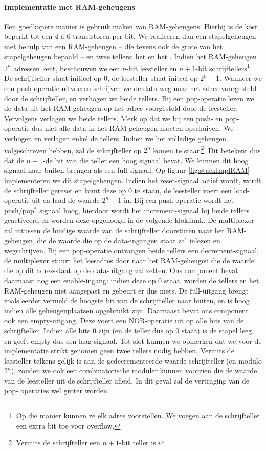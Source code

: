 \paragraph{Implementatie met RAM-geheugens}
Een goedkopere manier is gebruik maken van RAM-geheugens. Hierbij is de kost beperkt tot een 4 \`a 6 transistoren per bit. We realiseren dan een stapelgeheugen met behulp van een RAM-geheugen -- die tevens ook de grote van het stapelgeheugen bepaald -- en twee tellers: het  en het . Indien het RAM-geheugen $2^n$ adressen kent, beschouwen we een $n$-bit leesteller en $n+1$-bit schrijftellers\footnote{Op die manier kunnen ze elk adres voorstellen. We voegen aan de schrijfteller een extra bit toe voor overflow.}. De schrijfteller staat initieel op $0$, de leesteller staat initeel op $2^n-1$. Wanneer we een push operatie uitvoeren schrijven we de data weg naar het adres voorgesteld door de schrijfteller, en verhogen we beide tellers. Bij een pop-operatie lezen we de data uit het RAM-geheugen op het adres voorgesteld door de leesteller. Vervolgens verlagen we beide tellers. Merk op dat we bij een push- en pop-operatie dus niet alle data in het RAM-geheugen moeten opschuiven.
We verhogen en verlagen enkel de tellers. Indien we het volledige geheugen volgeschreven hebben, zal de schrijfteller op $2^n$ komen te staan\footnote{Vermits de schrijfteller een $n+1$-bit teller is.}. Dit betekent dus dat de $n+1$-de bit van die teller een hoog signaal bevat. We kunnen dit hoog signaal naar buiten brengen als een full-signaal. Op figuur \ref{fig:stackImplRAM} implementeren we dit stapelgeheugen. Indien het reset-signaal actief wordt, wordt de schrijfteller gereset en komt deze op 0 te staan, de leesteller voert een load-operatie uit en laad de waarde $2^n-1$ in. Bij een push-operatie wordt het push/pop$^*$ signaal hoog, hierdoor wordt het increment-signaal bij beide tellers geactiveerd en worden deze opgehoogd in de volgende klokflank. De multiplexer zal intussen de huidige waarde van de schrijfteller doorsturen naar het RAM-geheugen, die de waarde die op de data-ingangen staat zal inlezen en wegschrijven. Bij een pop-operatie ontvangen beide tellers een decrement-signaal, de multiplexer
stuurt het leesadres door naar het RAM-geheugen die de waarde die op dit adres-staat op de data-uitgang zal zetten. Ons component bevat daarnaast nog een enable-ingang: indien deze op 0 staat, worden de tellers en het RAM-geheugen niet aangepast en gebeurt er dus niets. De full-uitgang brengt zoals eerder vermeld de hoogste bit van de schrijfteller naar buiten, en is hoog indien alle geheugenplaatsen opgebruikt zijn. Daarnaast bevat ons component ook een empty-uitgang. Deze voert een NOR-operatie uit op alle bits van de schrijfteller. Indien alle bits 0 zijn (en de teller dus op 0 staat) is de stapel leeg, en geeft empty dus een laag signaal. Tot slot kunnen we opmerken dat we voor de implementatie strikt genomen geen twee tellers nodig hebben. Vermits de leesteller telkens gelijk is aan de gedecrementeerde waarde schrijfteller (en modulo $2^n$), zouden we ook een combinatorische moduler kunnen voorzien die de waarde van de leesteller uit de schrijfteller afleid. In dit geval zal de vertraging van de pop-
operaties wel groter worden.
